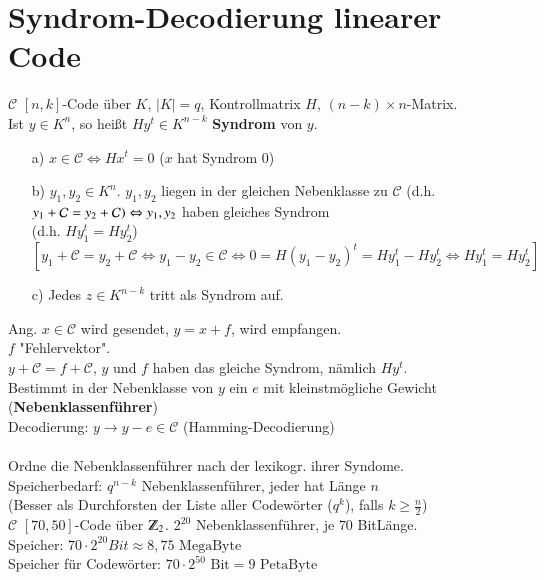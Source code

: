 \section{Syndrom-Decodierung linearer Code}
$\mathcal{C}$ $[n,k]$-Code \"uber $K$, $\left| K \right| = q$, Kontrollmatrix $H$, $(n-k) \times n$-Matrix.\\
Ist $y \in K^n$, so hei\ss t $Hy^t \in K^{n-k}$ \textbf{Syndrom} von $y$.
\begin{itemize}
	\item[a)]	$x \in \mathcal{C} \Leftrightarrow Hx^t = 0$ ($x$ hat Syndrom $0$)
	\item[b)] $y_1,y_2 \in K^n$. $y_1,y_2$ liegen in der gleichen Nebenklasse zu $\mathcal{C}$ (d.h. $y_1 + \mathcal{C} = y_2 + \mathcal{C})\\ \Leftrightarrow y_1,y_2$ haben gleiches Syndrom \\
	(d.h. $Hy_1^t = Hy_2^t$)
	\[
		[y_1 + \mathcal{C} = y_2 + \mathcal{C} \Leftrightarrow y_1 - y_2 \in \mathcal{C} \Leftrightarrow 0 = H(y_1 - y_2)^t = Hy_1^t - Hy_2^t \Leftrightarrow Hy_1^t = Hy_2^t]
	\]
	\item[c)] Jedes $z \in K^{n-k}$ tritt als Syndrom auf.	 
\end{itemize}
Ang. $x \in \mathcal{C}$ wird gesendet, $y=x+f$, wird empfangen.\\
$f$ "Fehlervektor".\\
$y + \mathcal{C} = f + \mathcal{C}$, $y$ und $f$ haben das gleiche Syndrom, n\"amlich $Hy^t$.\\
Bestimmt in der Nebenklasse von $y$ ein $e$ mit kleinstm\"ogliche Gewicht (\textbf{Nebenklassenf\"uhrer}) \\
Decodierung: $y \rightarrow y - e \in \mathcal{C}$ (Hamming-Decodierung)\\
\\
Ordne die Nebenklassenf\"uhrer nach der lexikogr. ihrer Syndome. \\
Speicherbedarf: $q^{n-k}$ Nebenklassenf\"uhrer, jeder hat L\"ange $n$ \\
(Besser als Durchforsten der Liste aller Codew\"orter ($q^k$), falls $k \geq \frac{n}{2}$)\\
$\mathcal{C}$ $[70,50]$-Code \"uber $\Z_2$. $2^{20}$ Nebenklassenf\"uhrer, je $70$ BitL\"ange.\\
Speicher: $70 \cdot 2^{20} Bit \approx 8,75 \text{ MegaByte}$ \\
Speicher f\"ur Codew\"orter: $70 \cdot 2^{50} \text{ Bit} = 9 \text{ PetaByte}$

